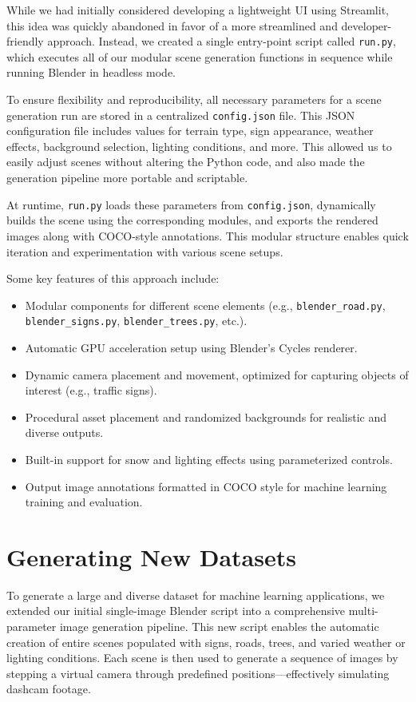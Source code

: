 \documentclass[journal]{IEEEtran}
\begin{document}
 While we had initially considered developing a lightweight UI using Streamlit, this idea was quickly abandoned in favor of a more streamlined and developer-friendly approach. Instead, we created a single entry-point script called \texttt{run.py}, which executes all of our modular scene generation functions in sequence while running Blender in headless mode.
 
 To ensure flexibility and reproducibility, all necessary parameters for a scene generation run are stored in a centralized \texttt{config.json} file. This JSON configuration file includes values for terrain type, sign appearance, weather effects, background selection, lighting conditions, and more. This allowed us to easily adjust scenes without altering the Python code, and also made the generation pipeline more portable and scriptable.
 
 At runtime, \texttt{run.py} loads these parameters from \texttt{config.json}, dynamically builds the scene using the corresponding modules, and exports the rendered images along with COCO-style annotations. This modular structure enables quick iteration and experimentation with various scene setups.
 
 Some key features of this approach include:
 
 \begin{itemize}
     \item Modular components for different scene elements (e.g., \texttt{blender\_road.py}, \texttt{blender\_signs.py}, \texttt{blender\_trees.py}, etc.).
     \item Automatic GPU acceleration setup using Blender's Cycles renderer.
     \item Dynamic camera placement and movement, optimized for capturing objects of interest (e.g., traffic signs).
     \item Procedural asset placement and randomized backgrounds for realistic and diverse outputs.
     \item Built-in support for snow and lighting effects using parameterized controls.
     \item Output image annotations formatted in COCO style for machine learning training and evaluation.
 \end{itemize}
 
 \section{Generating New Datasets}

 To generate a large and diverse dataset for machine learning applications, we extended our initial single-image Blender script into a comprehensive multi-parameter image generation pipeline. This new script enables the automatic creation of entire scenes populated with signs, roads, trees, and varied weather or lighting conditions. Each scene is then used to generate a sequence of images by stepping a virtual camera through predefined positions—effectively simulating dashcam footage.
 
\end{document}
